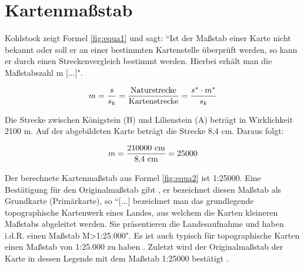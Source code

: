 \section{Kartenmaßstab}


Kohlstock zeigt Formel \ref{fig:equa1} und sagt: “Ist der Maßstab einer Karte nicht bekannt oder soll er an einer bestimmten Kartenstelle überprüft werden, so kann er durch einen Streckenvergleich bestimmt werden. Hierbei erhält man die Maßstabszahl m [...]". \cite{kohlstock_kartographie_2014}

\begin{equation}
\centering
m=\frac{s}{s_{k}}=\frac{\mbox {Naturstrecke}}{\mbox {Kartenstrecke}}=\frac{s^{*} \cdot m^{*}}{s_{k}} 
\label{fig:equa1}
\end{equation} %

Die Strecke zwischen Königstein (B) und Lilienstein (A) beträgt in Wirklichkeit 2100 m. Auf der abgebildeten Karte beträgt die Strecke 8,4 cm. Daraus folgt:

\begin{equation}
\centering
m=\frac{\mbox {210000 cm}}{\mbox {8,4 cm}}={\mbox{25000}}
\label{fig:equa2}
\end{equation}

Der berechnete Kartenmaßstab aus Formel \ref{fig:equa2} ist 1:25000. Eine Bestätigung für den Originalmaßstab gibt \cite{kohlstock_kartographie_2014}
, er bezeichnet diesen Maßstab als Grundkarte (Primärkarte), so “[...] bezeichnet man das grundlegende topographische Kartenwerk eines Landes, aus welchem die Karten kleineren Maßstabs abgeleitet werden. Sie präsentieren die Landesaufnahme und haben i.d.R. einen Maßstab M>1:25.000". Es ist auch typisch für topographische Karten einen Maßstab von 1:25.000 zu haben \cite{jensch_erde_1975}. Zuletzt wird der Originalmaßstab der Karte in dessen Legende mit dem Maßstab 1:25000 bestätigt  \cite{landesvermessungsamt_sachsen_topographische_2009}.